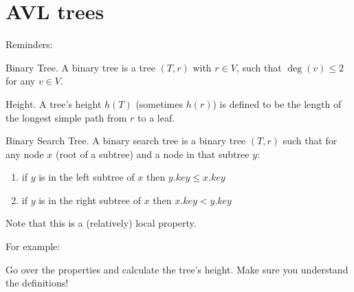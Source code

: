 \section{AVL trees}
    Reminders:
    \begin{defbox}{Binary Tree.}
        A binary tree is a tree $(T,r)$ with $r\in V$, such that $\deg(v)
            \leq 2$ for any $v\in V$.
    \end{defbox}
    \begin{defbox}{Height.} A tree's height $h(T)$ (sometimes $h(r)$) is defined to be the
    length of the
    longest
    simple path from $r$ to a leaf.
    \end{defbox}
    \begin{defbox}{ Binary Search Tree. } A binary search tree is a binary tree $(T,r)$ such that for any
    node $x$ (root of a subtree) and a node in that subtree $y$:
    \begin{enumerate}
        \item if $y$ is in the left subtree of $x$ then $y.key \leq x.key$
        \item if $y$ is in the right subtree of $x$ then $x.key < y.key$
    \end{enumerate}
        Note that this is a (relatively) local property.
    \end{defbox}
For example:\\
    \begin{center}
    \end{center}
\begin{remark} Go over the properties and calculate the tree's height. Make sure you understand the definitions!
\end{remark}

